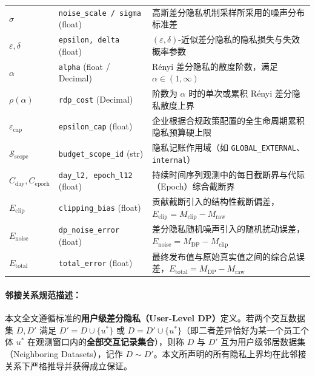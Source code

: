 \begin{table}[htbp]
\begin{tabularx}{\textwidth}{llX}
$\sigma$ & \texttt{noise\_scale / sigma} (float) & 高斯差分隐私机制采样所采用的噪声分布标准差 \\
$\varepsilon, \delta$ & \texttt{epsilon, delta} (float) & $(\varepsilon, \delta)$-近似差分隐私的隐私损失与失效概率参数 \\
$\alpha$ & \texttt{alpha} (float / Decimal) & Rényi 差分隐私的散度阶数，满足 $\alpha \in (1, \infty)$ \\
$\rho(\alpha)$ & \texttt{rdp\_cost} (Decimal) & 阶数为 $\alpha$ 时的单次或累积 Rényi 差分隐私散度上界 \\
$\varepsilon_{\text{cap}}$ & \texttt{epsilon\_cap} (float) & 企业根据合规政策配置的全生命周期累积隐私预算硬上限 \\
$\mathcal{S}_{\text{scope}}$ & \texttt{budget\_scope\_id} (str) & 隐私记账作用域（如 \texttt{GLOBAL\_EXTERNAL}、\texttt{internal}） \\
$C_{\text{day}}, C_{\text{epoch}}$ & \texttt{day\_l2, epoch\_l12} (float) & 持续时间序列观测中的每日截断界与代际（Epoch）综合截断界 \\
$E_{\text{clip}}$ & \texttt{clipping\_bias} (float) & 贡献截断引入的结构性截断偏差，$E_{\text{clip}} = M_{\text{clip}} - M_{\text{raw}}$ \\
$E_{\text{noise}}$ & \texttt{dp\_noise\_error} (float) & 差分隐私随机噪声引入的随机扰动误差，$E_{\text{noise}} = M_{\text{DP}} - M_{\text{clip}}$ \\
$E_{\text{total}}$ & \texttt{total\_error} (float) & 最终发布值与原始真实值之间的综合总误差，$E_{\text{total}} = M_{\text{DP}} - M_{\text{raw}}$ \\
\bottomrule
\end{tabularx}
\end{table}

\paragraph{邻接关系规范描述：}
本文全文遵循标准的\textbf{用户级差分隐私（User-Level DP）}定义。若两个交互数据集 $D, D'$ 满足 $D' = D \cup \{u^*\}$ 或 $D = D' \cup \{u^*\}$（即二者差异恰好为某一个员工个体 $u^*$ 在观测窗口内的\textbf{全部交互记录集合}），则称 $D$ 与 $D'$ 互为用户级邻居数据集（Neighboring Datasets），记作 $D \sim D'$。本文所声明的所有隐私上界均在此邻接关系下严格推导并获得成立保证。
